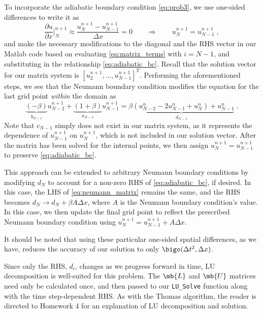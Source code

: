 \documentclass[11pt]{article}
\begin{document}
To incorporate the adiabatic boundary condition \eqref{eq:prob3}, we use one-sided differences to write it as
\begin{equation}
\frac{\partial u}{\partial x} \Big|_N^{n+1} \approx \frac{u_N^{n+1} - u_{N-1}^{n+1}}{\Delta x} = 0
\qquad \Rightarrow \qquad
u_N^{n+1} = u_{N-1}^{n+1}
\;,
\label{eq:adiabatic_bc}
\end{equation}
and make the necessary modifications to the diagonal and the RHS vector in our Matlab code based on evaluating \eqref{eq:matrix_terms} with $i=N-1$, and substituting in the relationship \eqref{eq:adiabatic_bc}. Recall that the solution vector for our matrix system is $[ u_2^{n+1}, \dots, u_{N-1}^{n+1} ]^T$. Performing the aforementioned steps, we see that the Neumann boundary condition modifies the equation for the last grid point \emph{within} the domain as
\begin{equation}
  \underbrace{\left(      -\beta \right)}_{b_{N-1}} u_{N-2}^{n+1}
+ \underbrace{\left( 1 +   \beta \right)}_{a_{N-1}} u_{N-1}^{n+1}
=
\underbrace{\beta \left( u_{N-2}^n - 2 u_{N-1}^n + u_{N}^n \right) + u_{N-1}^n}_{d_{N-1}}
\;.
\label{eq:neumann_matrix}
\end{equation}
Note that $c_{N-1}$ simply does not exist in our matrix system, as it represents the dependence of $u_{N-1}^{n+1}$ on $u_N^{n+1}$, which is not included in our solution vector. After the matrix has been solved for the internal points, we then assign $u_N^{n+1} = u_{N-1}^{n+1}$ to preserve \eqref{eq:adiabatic_bc}.

This approach can be extended to arbitrary Neumann boundary conditions by modifying $d_N$ to account for a non-zero RHS of \eqref{eq:adiabatic_bc}, if desired. In this case, the LHS of \eqref{eq:neumann_matrix} remains the same, and the RHS becomes $d_N \rightarrow d_N + \beta A \Delta x$, where $A$ is the Neumann boundary condition's value. In this case, we then update the final grid point to reflect the prescribed Neumann boundary condition using $u_N^{n+1} = u_{N-1}^{n+1} + A  \Delta x$.

It should be noted that using these particular one-sided spatial differences, as we have, reduces the accuracy of our solution to only $\bigo(\Delta t^2, \Delta x)$.

Since only the RHS, $d_i$, changes as we progress forward in time, LU decomposition is well-suited for this problem. The $\mb{L}$ and $\mb{U}$ matrices need only be calculated once, and then passed to our \lstinline|LU_Solve| function along with the time step-dependent RHS. As with the Thomas algorithm, the reader is directed to Homework 4 for an explanation of LU decomposition and solution.
\end{document}
